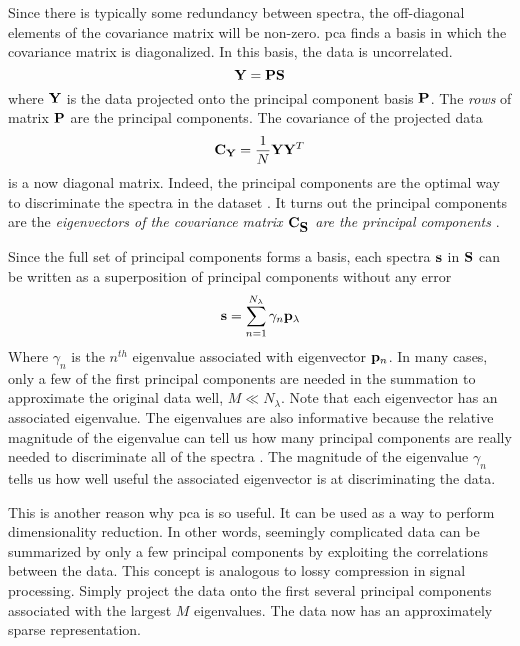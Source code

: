 Since there is typically some redundancy between spectra, the off-diagonal elements of the covariance matrix will be non-zero. \Gls{pca} finds a basis in which the covariance matrix is diagonalized. In this basis, the data is uncorrelated.
% 
\begin{equation}
	\displaystyle \mathbf{Y} = \displaystyle \mathbf{PS}
\end{equation}
%
where $\displaystyle \mathbf{Y}$ is the data projected onto the principal component basis $\displaystyle \mathbf{P}$. The \emph{rows} of matrix $\displaystyle \mathbf{P}$ are the principal components.  The covariance of the projected data
%
\begin{equation}
	\displaystyle \mathbf{C_{Y}} = \frac{1}{N} \displaystyle \mathbf{Y} \displaystyle \mathbf{Y}^{T} 
\end{equation}
%
is a now diagonal matrix. Indeed, the principal components are the optimal way to discriminate the spectra in the dataset \cite{jolliffe2002principal}. It turns out the principal components are the \emph{eigenvectors of the covariance matrix $\displaystyle \mathbf{C}_{\displaystyle \mathbf{S}}$ are the principal components} \cite{shlens2014tutorial}. 

Since the full set of principal components forms a basis, each spectra $\displaystyle \mathbf{s}$ in $\displaystyle \mathbf{S}$ can be written as a superposition of principal components without any error
\begin{equation}
\displaystyle \mathbf{s} = \sum_{n = 1}^{N_{\lambda}} \gamma_{n} \displaystyle \mathbf{p}_{\lambda}
\end{equation}
Where $\gamma_{n}$ is the $n^{th}$ eigenvalue associated with eigenvector $\displaystyle \mathbf{p}_{n}$. In many cases, only a few of the first principal components are needed in the summation to approximate the original data well, $M \ll N_{\lambda} $. Note that each eigenvector has an associated eigenvalue. The eigenvalues are also informative because the relative magnitude of the eigenvalue can tell us how many principal components are really needed to discriminate all of the spectra \cite{poon2009image}. The magnitude of the eigenvalue $\gamma_{n}$ tells us how well useful the associated eigenvector is at discriminating the data.


This is another reason why \gls{pca} is so useful. It can be used as a way to perform dimensionality reduction. In other words, seemingly complicated data can be summarized by only a few principal components by exploiting the correlations between the data. This concept is analogous to lossy compression in signal processing. Simply project the data onto the first several principal components associated with the largest $M$ eigenvalues. The data now has an approximately sparse representation. 

